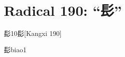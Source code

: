 
\section*{Radical 190: ``⾽''}

\begin{entry}{髟}{10}{⾽}[Kangxi 190]
  \begin{phonetics}{髟}{biao1}
  \end{phonetics}
\end{entry}


